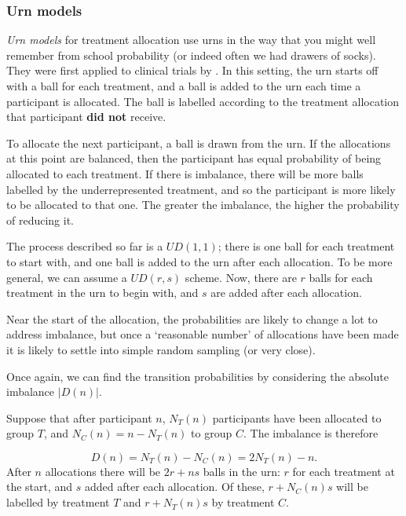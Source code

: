 \documentclass[
  openany]{book}
\theoremstyle{definition}
\theoremstyle{definition}
\theoremstyle{definition}
\theoremstyle{definition}
\theoremstyle{remark}
\begin{document}
\hypertarget{urn-models}{%
\subsubsection{Urn models}\label{urn-models}}

\emph{Urn models} for treatment allocation use urns in the way that you might well remember from school probability (or indeed often we had drawers of socks). They were first applied to clinical trials by \citet{wei1978application}. In this setting, the urn starts off with a ball for each treatment, and a ball is added to the urn each time a participant is allocated. The ball is labelled according to the treatment allocation that participant \textbf{did not} receive.

To allocate the next participant, a ball is drawn from the urn. If the allocations at this point are balanced, then the participant has equal probability of being allocated to each treatment. If there is imbalance, there will be more balls labelled by the underrepresented treatment, and so the participant is more likely to be allocated to that one. The greater the imbalance, the higher the probability of reducing it.

The process described so far is a \(UD\left(1,1\right)\); there is one ball for each treatment to start with, and one ball is added to the urn after each allocation. To be more general, we can assume a \(UD\left(r,s\right)\) scheme. Now, there are \(r\) balls for each treatment in the urn to begin with, and \(s\) are added after each allocation.

Near the start of the allocation, the probabilities are likely to change a lot to address imbalance, but once a `reasonable number' of allocations have been made it is likely to settle into simple random sampling (or very close).

Once again, we can find the transition probabilities by considering the absolute imbalance \(\lvert D\left(n\right) \rvert\).

Suppose that after participant \(n\), \(N_T\left(n\right)\) participants have been allocated to group \(T\), and \(N_C\left(n\right) = n - N_T\left(n\right)\) to group \(C\). The imbalance is therefore

\[D\left(n\right) = N_T\left(n\right) - N_C\left(n\right) = 2N_T\left(n\right) - n.\]
After \(n\) allocations there will be \(2r + ns\) balls in the urn: \(r\) for each treatment at the start, and \(s\) added after each allocation. Of these, \(r + N_C\left(n\right)s\) will be labelled by treatment \(T\) and \(r + N_T\left(n\right)s\) by treatment \(C\).
\end{document}
